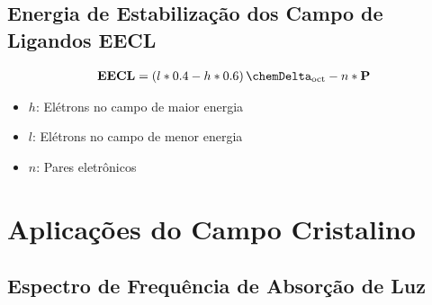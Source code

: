 \documentclass{article}
\begin{document}
{{\subsection{Energia de Estabilização dos Campo de Ligandos EECL}

{\large\bfseries\boldmath
\begin{align*}
	\textbf{EECL}
=	(l*0.4-h*0.6)\,\chemDelta\textsubscript{oct}
-	n*\textbf{P}
\end{align*}
}

\begin{multicols}{2}
\begin{itemize}[left=0mm]
	
	\item $h$: Elétrons no campo de maior energia
	\item $l$: Elétrons no campo de menor energia
	\item $n$: Pares eletrônicos
	
\end{itemize}
\end{multicols}

\section*{Aplicações do Campo Cristalino}

\subsection{Espectro de Frequência de Absorção de Luz}

}}
\end{document}
